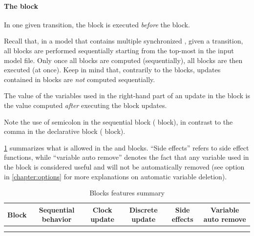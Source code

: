 \paragraph{The  block}

In one given transition, the  block is executed \emph{before} the  block.

Recall that, in a model that contains multiple synchronized \IPTA{}, given a transition, all  blocks are performed sequentially starting from the top-most \IPTA{} in the input model file.
Only once all  blocks are computed (sequentially), all  blocks are then executed (at once).
Keep in mind that, contrarily to the  blocks, updates contained in  blocks are \emph{not} computed sequentially.

The value of the variables used in the right-hand part of an update in the  block is the value computed \emph{after} executing the  block updates.



\begin{remark}
	Note the use of semicolon in the sequential block ( block), in contrast to the comma in the declarative block ( block).
\end{remark}

\cref{table:summary:blocks-characteristics} summarizes what is allowed in the  and  blocks.
``Side effects'' refers to side effect functions, while ``variable auto remove'' denotes the fact that any variable used in the  block is considered useful and will not be automatically removed (see option  in \cref{chapter:options} for more explanations on \imitator{} automatic variable deletion).


\begin{table}[tb]
	\caption{Blocks features summary}
	{\centering
	\small
	\setlength{\tabcolsep}{2pt} %
		\begin{tabular}{ | l | c | c | c | c | c | }
			\hline
			\rowHeader{} \textbf{Block} & \textbf{Sequential behavior} & \textbf{Clock update} & \textbf{Discrete update} & \textbf{Side effects} & \textbf{Variable auto remove} \\
			\hline
			\styleIMI{seq} & \cellYes{} & \cellNo{} & \cellYes{} & \cellYes{} & \cellNo{}        \\
			\hline
			\styleIMI{then} & \cellNo{} & \cellYes{} & \cellYes{} & \cellNo{} & \cellYes{}        \\
			\hline
		\end{tabular}

	}

	\label{table:summary:blocks-characteristics}
\end{table}

